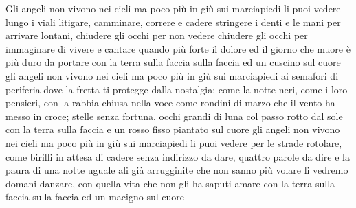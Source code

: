 \beginverse
Gli angeli non vivono nei cieli
ma poco più in giù sui marciapiedi
li puoi vedere lungo i viali litigare,
camminare, correre e cadere
stringere i denti e le mani
per arrivare lontani,
chiudere gli occhi per non vedere
chiudere gli occhi per immaginare
di vivere e cantare quando più forte
il dolore ed il giorno che muore è più duro da portare con la terra sulla faccia
sulla faccia ed un cuscino sul cuore
gli angeli non vivono nei cieli
ma poco più in giù sui marciapiedi
ai semafori di periferia dove la fretta
ti protegge dalla nostalgia;
come la notte neri, come i loro pensieri, con la rabbia chiusa nella voce
come rondini di marzo
che il vento ha messo in croce;
stelle senza fortuna, occhi grandi di luna col passo rotto dal sole
con la terra sulla faccia
e un rosso fisso piantato sul cuore
gli angeli non vivono nei cieli
ma poco più in giù  sui marciapiedi
li puoi vedere per le strade rotolare,
come birilli in attesa di cadere
senza indirizzo da dare,
quattro parole da dire
e la paura di una notte uguale
ali già arrugginite che non sanno più volare li vedremo domani danzare, con quella vita che non gli ha saputi amare
con la terra sulla faccia sulla faccia
ed un macigno sul cuore
\endverse
\endsong
